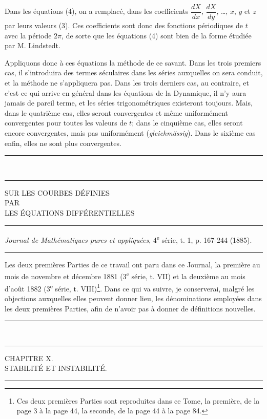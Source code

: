 \documentclass[11pt]{article}
\newcommand{\ornament}{\begin{center}\rule{2.5em}{0.4pt}\,\raisebox{0.1ex}{\tiny$\bullet\bullet\bullet$}\,\rule{2.5em}{0.4pt}\end{center}}
\newcommand{\shortline}{\begin{center}\rule{3.5em}{0.4pt}\end{center}}
\begin{document}
Dans les équations (4), on a remplacé, dans les coefficients $\dfrac{dX}{dx}$, $\dfrac{dX}{dy}$, \ldots, $x$, $y$ et $z$ par leurs valeurs (3). Ces coefficients sont donc des fonctions périodiques de $t$ avec la période $2\pi$, de sorte que les équations (4) sont bien de la forme étudiée par M. Lindstedt.

Appliquons donc à ces équations la méthode de ce savant. Dans les trois premiers cas, il s’introduira des termes séculaires dans les séries auxquelles on sera conduit, et la méthode ne s’appliquera pas. Dans les trois derniers cas, au contraire, et c’est ce qui arrive en général dans les équations de la Dynamique, il n’y aura jamais de pareil terme, et les séries trigonométriques existeront toujours. Mais, dans le quatrième cas, elles seront convergentes et même uniformément convergentes pour toutes les valeurs de $t$; dans le cinquième cas, elles seront encore convergentes, mais pas uniformément (\emph{gleichmässig}). Dans le sixième cas enfin, elles ne sont plus convergentes.

\ornament
\clearpage

\begin{center}
{\Large SUR LES COURBES DÉFINIES}\\[0.8em]
{\small PAR}\\[0.8em]
{\large LES ÉQUATIONS DIFFÉRENTIELLES}
\end{center}
\shortline
\begin{center}
\emph{Journal de Mathématiques pures et appliquées}, 4\textsuperscript{e} série, t. 1, p. 167-244 (1885).
\end{center}
\shortline

Les deux premières Parties de ce travail ont paru dans ce Journal, la première au mois de novembre et décembre 1881 (3\textsuperscript{e} série, t. VII) et la deuxième au mois d’août 1882 (3\textsuperscript{e} série, t. VIII)\footnote{Ces deux premières Parties sont reproduites dans ce Tome, la première, de la page 3 à la page 44, la seconde, de la page 44 à la page 84.}. Dans ce qui va suivre, je conserverai, malgré les objections auxquelles elles peuvent donner lieu, les dénominations employées dans les deux premières Parties, afin de n’avoir pas à donner de définitions nouvelles.

\ornament

\begin{center}
{\Large CHAPITRE X.}\\[0.4em]
{\small STABILITÉ ET INSTABILITÉ.}
\end{center}
\shortline
\end{document}
